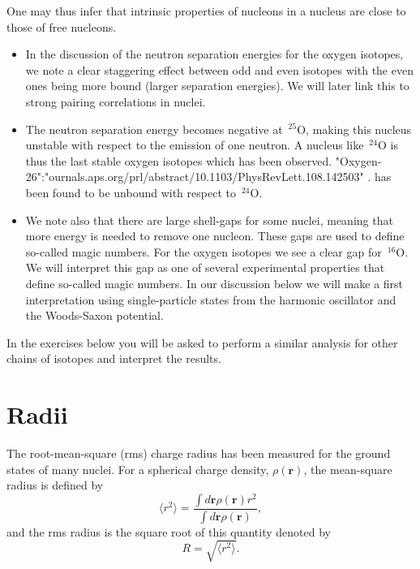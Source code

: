 \documentclass[%
twoside,                 %
final,                   %
10pt]{article}
\begin{document}
\noindent
One may thus infer that intrinsic properties of nucleons in a nucleus are close to those of free nucleons.
\begin{itemize}
\item In the discussion of the neutron separation energies for the oxygen isotopes, we note  a clear staggering effect between odd and even isotopes with the even ones being more bound (larger separation energies). We will later link this to strong pairing correlations in nuclei.

\item The neutron separation energy becomes negative at $\,{}^{25}\mbox{O}$, making this nucleus unstable with respect to the emission of one neutron. A nucleus like $\,{}^{24}\mbox{O}$ is thus the last stable oxygen isotopes which has been observed. "Oxygen-26":"ournals.aps.org/prl/abstract/10.1103/PhysRevLett.108.142503" . has been found to be unbound with respect to $\,{}^{24}\mbox{O}$.

\item We note also that there are large shell-gaps for some nuclei, meaning that more energy is needed to remove one nucleon. These gaps are used to define so-called magic numbers. For the oxygen isotopes we see a clear gap for $\,{}^{16}\mbox{O}$. We will interpret this gap as one of several experimental properties that define so-called magic numbers. In our discussion below we will make a first interpretation using  single-particle states from the harmonic oscillator and the Woods-Saxon potential. 
\end{itemize}

\noindent
In the exercises below you will be asked to perform a similar analysis for other chains of isotopes and interpret the results. 



\section*{Radii}

The root-mean-square (rms) charge radius has been measured for the ground states of many
nuclei. For a spherical charge density, $\rho(\bm{r})$, the mean-square radius is defined by
\[
\langle r^2\rangle = \frac{ \int  d \bm{r} \rho(\bm{r}) r^2}{ \int  d \bm{r} \rho(\bm{r})},
\]
and the rms radius is the square root of this quantity denoted by
\[
R =\sqrt{ \langle r^2\rangle}.
\]
\end{document}
